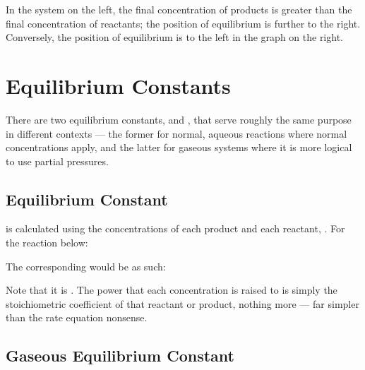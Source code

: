 				In the system on the left, the final concentration of products is greater than the final concentration of reactants;
				 the position of equilibrium is further to the right. Conversely, the position of equilibrium is to the left
				in the graph on the right.





	\pagebreak
	\section{Equilibrium Constants}

		There are two equilibrium constants, \Kc{} and \Kp{}, that serve roughly the same purpose in different contexts --- the former for normal,
		aqueous reactions where normal concentrations apply, and the latter for gaseous systems where it is more logical to use partial pressures.

		\subsection{Equilibrium Constant \MKc{}}

			\Kc{} is calculated using the concentrations of each product and each reactant, . For the reaction below:


			The corresponding \Kc{} would be as such:


			Note that it is . The power that each concentration is raised to is simply the stoichiometric
			coefficient of that reactant or product, nothing more --- far simpler than the rate equation nonsense.



		\subsection{Gaseous Equilibrium Constant \MKp{}}

